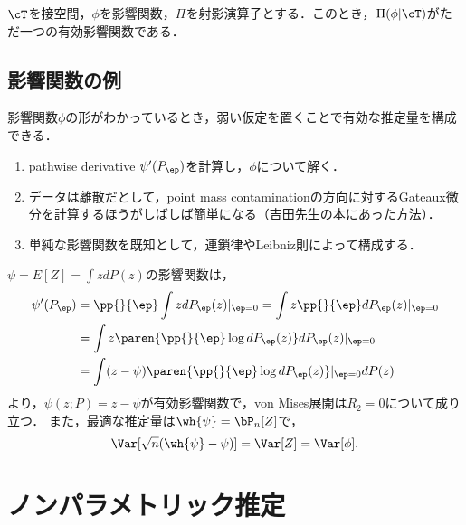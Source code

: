 \documentclass[uplatex,dvipdfmx]{jsreport}
\begin{document}
\begin{theorem}
    $\cT$を接空間，$\phi$を影響関数，$\Pi$を射影演算子とする．このとき，$\Pi(\phi|\cT)$がただ一つの有効影響関数である．
\end{theorem}

\subsection{影響関数の例}

\begin{tcolorbox}[colframe=ForestGreen, colback=ForestGreen!10!white,breakable,colbacktitle=ForestGreen!40!white,coltitle=black,fonttitle=\bfseries\sffamily,
title=]
    影響関数$\phi$の形がわかっているとき，弱い仮定を置くことで有効な推定量を構成できる．
\end{tcolorbox}

\begin{discussion}[影響関数の求め方]\mbox{}
    \begin{enumerate}
        \item pathwise derivative $\psi'(P_\ep)$を計算し，$\phi$について解く．
        \item データは離散だとして，point mass contaminationの方向に対するGateaux微分を計算するほうがしばしば簡単になる（吉田先生の本にあった方法）．
        \item 単純な影響関数を既知として，連鎖律やLeibniz則によって構成する．
    \end{enumerate}
\end{discussion}

\begin{example}[平均]
    $\psi=E[Z]=\int zdP(z)$の影響関数は，
    \begin{align*}
        \psi'(P_\ep)&=\pp{}{\ep}\int zdP_\ep(z)|_{\ep=0}=\int z\pp{}{\ep}dP_\ep(z)|_{\ep=0}\\
        &=\int z\paren{\pp{}{\ep}\log dP_\ep(z)}dP_\ep(z)|_{\ep=0}\\
        &=\int(z-\psi)\paren{\pp{}{\ep}\log dP_\ep(z)}|_{\ep=0}dP(z)
    \end{align*}
    より，$\psi(z;P)=z-\psi$が有効影響関数で，von Mises展開は$R_2=0$について成り立つ．
    また，最適な推定量は$\wh{\psi}=\bP_n[Z]$で，
    \[\Var[\sqrt{n}(\wh{\psi}-\psi)]=\Var[Z]=\Var[\phi].\]
\end{example}

\section{ノンパラメトリック推定}
\end{document}
